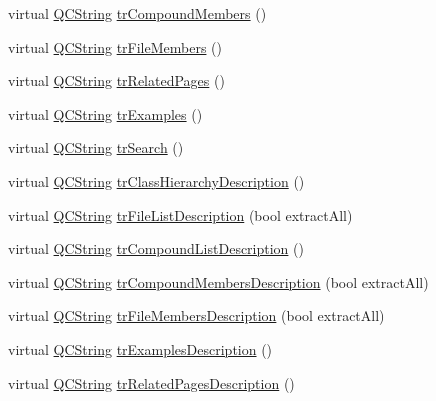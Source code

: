 \begin{DoxyCompactItemize}
\item 
virtual \mbox{\hyperlink{class_q_c_string}{Q\+C\+String}} \mbox{\hyperlink{class_translator_serbian_cyrillic_af39b610f59d476efd2111fd76a632a59}{tr\+Compound\+Members}} ()
\item 
virtual \mbox{\hyperlink{class_q_c_string}{Q\+C\+String}} \mbox{\hyperlink{class_translator_serbian_cyrillic_a63c7e24c62c4680abf0434c95ac608dd}{tr\+File\+Members}} ()
\item 
virtual \mbox{\hyperlink{class_q_c_string}{Q\+C\+String}} \mbox{\hyperlink{class_translator_serbian_cyrillic_a82e680dbbdf1d8d0ccc1a14a809551d6}{tr\+Related\+Pages}} ()
\item 
virtual \mbox{\hyperlink{class_q_c_string}{Q\+C\+String}} \mbox{\hyperlink{class_translator_serbian_cyrillic_abd4dc589411ccaeb55462764edeb5367}{tr\+Examples}} ()
\item 
virtual \mbox{\hyperlink{class_q_c_string}{Q\+C\+String}} \mbox{\hyperlink{class_translator_serbian_cyrillic_a447e13ea8e6226bfa87bf2c30c0ae930}{tr\+Search}} ()
\item 
virtual \mbox{\hyperlink{class_q_c_string}{Q\+C\+String}} \mbox{\hyperlink{class_translator_serbian_cyrillic_a35b729c52cf233fb61071a900d1e01aa}{tr\+Class\+Hierarchy\+Description}} ()
\item 
virtual \mbox{\hyperlink{class_q_c_string}{Q\+C\+String}} \mbox{\hyperlink{class_translator_serbian_cyrillic_a00f6a31cf25bacaaa79faf331f05582c}{tr\+File\+List\+Description}} (bool extract\+All)
\item 
virtual \mbox{\hyperlink{class_q_c_string}{Q\+C\+String}} \mbox{\hyperlink{class_translator_serbian_cyrillic_a5f3ca6282fa0ccaba3f06f0173d24682}{tr\+Compound\+List\+Description}} ()
\item 
virtual \mbox{\hyperlink{class_q_c_string}{Q\+C\+String}} \mbox{\hyperlink{class_translator_serbian_cyrillic_a45d3d0417606052c403675e8f4eb1706}{tr\+Compound\+Members\+Description}} (bool extract\+All)
\item 
virtual \mbox{\hyperlink{class_q_c_string}{Q\+C\+String}} \mbox{\hyperlink{class_translator_serbian_cyrillic_aac4241d628c4690403ace2a12bea128c}{tr\+File\+Members\+Description}} (bool extract\+All)
\item 
virtual \mbox{\hyperlink{class_q_c_string}{Q\+C\+String}} \mbox{\hyperlink{class_translator_serbian_cyrillic_a1e5a0dad07a8b79a296541236bf0708e}{tr\+Examples\+Description}} ()
\item 
virtual \mbox{\hyperlink{class_q_c_string}{Q\+C\+String}} \mbox{\hyperlink{class_translator_serbian_cyrillic_a61814f2e4e14f1228d982421a1f299b0}{tr\+Related\+Pages\+Description}} ()

\end{DoxyCompactItemize}
